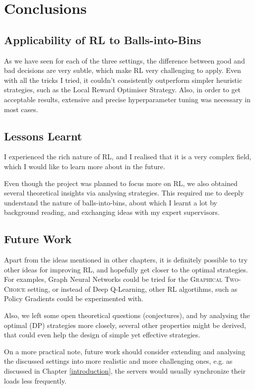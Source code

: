 
\chapter{Conclusions}\label{conclusion}

\ifpdf
    \graphicspath{{Chapter3/Figs/Raster/}{Chapter3/Figs/PDF/}{Chapter3/Figs/}}
\else
    \graphicspath{{Chapter3/Figs/Vector/}{Chapter3/Figs/}}
\fi



\section{Applicability of RL to Balls-into-Bins}

As we have seen for each of the three settings, the difference between good and bad decisions are very subtle, which make RL very challenging to apply. Even with all the tricks I tried, it couldn't consistently outperform simpler heuristic strategies, such as the Local Reward Optimiser Strategy. Also, in order to get acceptable results, extensive and precise hyperparameter tuning was necessary in most cases. 



\section{Lessons Learnt}

I experienced the rich nature of RL, and I realised that it is a very complex field, which I would like to learn more about in the future. 

Even though the project was planned to focus more on RL, we also obtained several theoretical insights via analysing strategies. This required me to deeply understand the nature of balls-into-bins, about which I learnt a lot by background reading, and exchanging ideas with my expert supervisors. 

\section{Future Work}

Apart from the ideas mentioned in other chapters, it is definitely possible to try other ideas for improving RL, and hopefully get closer to the optimal strategies. For examples, Graph Neural Networks could be tried for the \textsc{Graphical Two-Choice} setting, or instead of Deep Q-Learning, other RL algortihms, such as Policy Gradients could be experimented with. 


Also, we left some open theoretical questions (conjectures), and by analysing the optimal (DP) strategies more closely, several other properties might be derived, that could even help the design of simple yet effective strategies.


On a more practical note, future work should consider extending and analysing the discussed settings into more realistic and more challenging ones, e.g. as discussed in Chapter \ref{introduction}, the servers would usually synchronize their loads less frequently. 